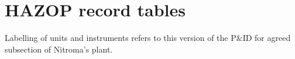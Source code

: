 \section{HAZOP record tables}

Labelling of units and instruments refers to this version of the P\&ID for agreed subsection of Nitroma's plant.







